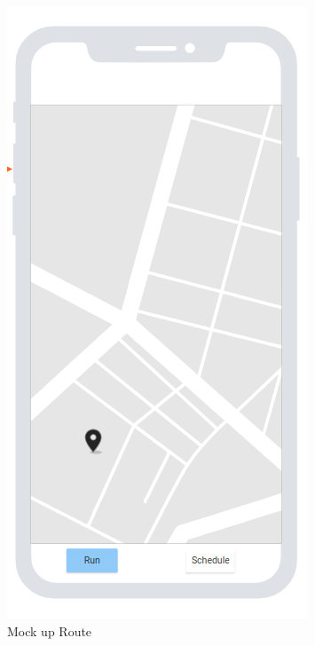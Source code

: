     \begin{figure}[h!]
        \includegraphics[width=\linewidth]{./graphics/route_Mockup.png}
        \caption{Mock up Route}
        \label{fig:routeMockup}
    \end{figure}


